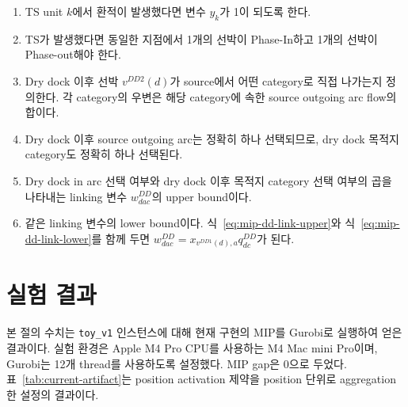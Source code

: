 \documentclass[11pt]{article}
\begin{document}
\begin{enumerate}[label=(\arabic*), leftmargin=*]
  \item TS unit $k$에서 환적이 발생했다면 변수 $y_k$가 1이 되도록 한다.
  \item TS가 발생했다면 동일한 지점에서 1개의 선박이 Phase-In하고 1개의 선박이 Phase-out해야 한다.
  \item Dry dock 이후 선박 $v^{DD2}(d)$가 source에서 어떤 category로 직접 나가는지 정의한다. 각 category의 우변은 해당 category에 속한 source outgoing arc flow의 합이다.
  \item Dry dock 이후 source outgoing arc는 정확히 하나 선택되므로, dry dock 목적지 category도 정확히 하나 선택된다.
  \item Dry dock in arc 선택 여부와 dry dock 이후 목적지 category 선택 여부의 곱을 나타내는 linking 변수 $w^{DD}_{dac}$의 upper bound이다.
  \item 같은 linking 변수의 lower bound이다. 식~\eqref{eq:mip-dd-link-upper}와 식~\eqref{eq:mip-dd-link-lower}를 함께 두면 $w^{DD}_{dac}=x_{v^{DD1}(d),a}q^{DD}_{dc}$가 된다.
\end{enumerate}

\section{실험 결과}

본 절의 수치는 \texttt{toy\_v1} 인스턴스에 대해 현재 구현의 MIP를 Gurobi로
실행하여 얻은 결과이다. 실험 환경은 Apple M4 Pro CPU를 사용하는 M4 Mac mini
Pro이며, Gurobi는 12개 thread를 사용하도록 설정했다. MIP gap은 0으로 두었다.
표~\ref{tab:current-artifact}는 position activation 제약을 position 단위로
aggregation한 설정의 결과이다.
\end{document}
